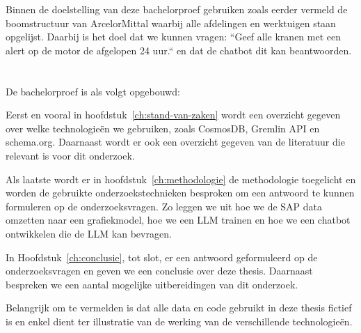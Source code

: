 Binnen de doelstelling van deze bachelorproef gebruiken zoals eerder vermeld de boomstructuur van ArcelorMittal waarbij alle afdelingen en werktuigen staan opgelijst. 
Daarbij is het doel dat we kunnen vragen: ``Geef alle kranen met een alert op de motor de afgelopen 24 uur.`` en dat de chatbot dit kan beantwoorden.
\section{}%
\label{sec:opzet-bachelorproef}


De bachelorproef is als volgt opgebouwd:

Eerst en vooral in hoofdstuk~\ref{ch:stand-van-zaken} wordt een overzicht gegeven over welke technologieën we gebruiken, zoals CosmosDB, Gremlin API en schema.org.
Daarnaast wordt er ook een overzicht gegeven van de literatuur die relevant is voor dit onderzoek.

Als laatste wordt er in hoofdstuk~\ref{ch:methodologie} de methodologie toegelicht en worden de gebruikte onderzoekstechnieken besproken om een antwoord te kunnen formuleren op de onderzoeksvragen.
Zo leggen we uit hoe we de SAP data omzetten naar een grafiekmodel, hoe we een LLM trainen en hoe we een chatbot ontwikkelen die de LLM kan bevragen.


In Hoofdstuk~\ref{ch:conclusie}, tot slot, er een antwoord geformuleerd op de onderzoeksvragen en geven we een conclusie over deze thesis. Daarnaast bespreken we een aantal mogelijke uitbereidingen van dit onderzoek.

Belangrijk om te vermelden is dat alle data en code gebruikt in deze thesis fictief is en enkel dient ter illustratie van de werking van de verschillende technologieën.